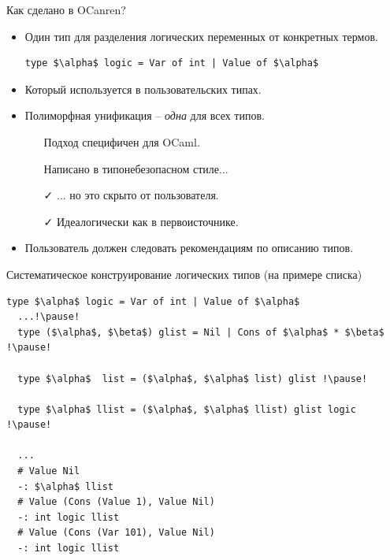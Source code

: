 \documentclass[10pt, mathserif]{beamer}
\theoremstyle{definition}
\begin{document}
\begin{frame}[fragile]{Как сделано в OCanren?}

\begin{itemize}
 \item Один тип для разделения логических переменных от конкретных термов.
    \begin{lstlisting}[mathescape=true]
      type $\alpha$ logic = Var of int | Value of $\alpha$
    \end{lstlisting}
 \item Который используется в пользовательских типах.

 \pause
 \item Полиморфная унификация -- \emph{одна} для всех типов.
    \vspace{1em}
    \begin{itemize}
    \item[\faTimes] Подход специфичен для OCaml.
    \item[\faTimes] Написано в типонебезопасном стиле...
    \item[\faCheck] ... но это скрыто от пользователя.
    \item[\faCheck] Идеалогически как в первоисточнике.
    \end{itemize}
  \pause
  \item Пользователь должен следовать рекомендациям по описанию типов.
\end{itemize}
\end{frame}

\begin{frame}[fragile]{Систематическое конструирование логических типов (на примере списка)}
  \begin{lstlisting}[mathescape=true]
  type $\alpha$ logic = Var of int | Value of $\alpha$
  ...!\pause!
  type ($\alpha$, $\beta$) glist = Nil | Cons of $\alpha$ * $\beta$ !\pause!

  type $\alpha$  list = ($\alpha$, $\alpha$ list) glist !\pause!

  type $\alpha$ llist = ($\alpha$, $\alpha$ llist) glist logic !\pause!

  ...
  # Value Nil
  -: $\alpha$ llist
  # Value (Cons (Value 1), Value Nil)
  -: int logic llist
  # Value (Cons (Var 101), Value Nil)
  -: int logic llist
  \end{lstlisting}
\end{frame}
\end{document}
